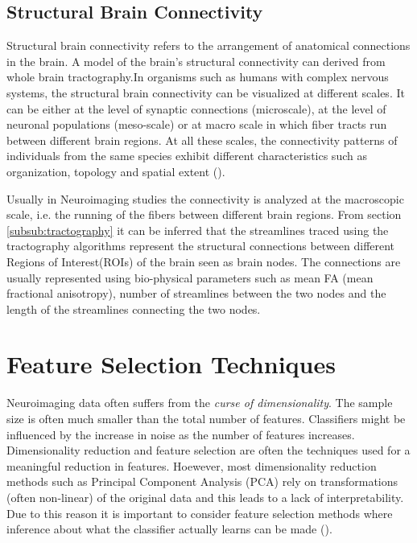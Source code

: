 \documentclass[msthesis.tex]{subfiles}
\begin{document}
\subsection{Structural Brain Connectivity}
Structural brain connectivity refers to the arrangement of anatomical connections in the brain. A model of the brain's structural connectivity can derived from whole brain tractography.In organisms such as humans with complex nervous systems, the structural brain connectivity can be visualized at different scales. It can be either at the level of synaptic connections (microscale), at the level of neuronal populations (meso-scale) or at macro scale in which fiber tracts run between different brain regions. At all these scales, the connectivity patterns of individuals from the same species exhibit different characteristics such as organization, topology and spatial extent (\cite{Sporns:2007}).

Usually in Neuroimaging studies the connectivity is analyzed at the macroscopic scale, i.e. the running of the fibers between different brain regions.  From section \autoref{subsub:tractography} it can be inferred that the streamlines traced using the tractography algorithms represent the structural connections between different Regions of Interest(ROIs) of the brain seen as brain nodes. The connections are usually represented using bio-physical parameters such as mean FA (mean fractional anisotropy), number of streamlines between the two nodes and the length of the streamlines connecting the two nodes.


\section{Feature Selection Techniques}
\label{sec:feature_selection}
Neuroimaging data often suffers from the \textit{curse of dimensionality}. The sample size is often much smaller than the total number of features. Classifiers might be influenced by the increase in noise as the number of features increases. Dimensionality reduction and feature selection are often the techniques used for a meaningful reduction in features. Hoewever, most dimensionality reduction methods such as Principal Component Analysis (PCA) rely on transformations (often non-linear) of the original data and this leads to a lack of interpretability. Due to this reason it is important to consider feature selection methods where inference about what the classifier actually learns can be made (\cite{shi2018feature}). 
\end{document}
